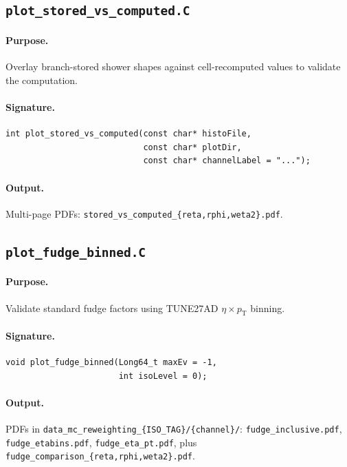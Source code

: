 \documentclass[12pt,a4paper]{article}
\begin{document}
\subsection{\texttt{plot\_stored\_vs\_computed.C}}
\label{sec:scripts:stored_vs_computed}

\paragraph{Purpose.} Overlay branch-stored shower shapes against
cell-recomputed values to validate the computation.

\paragraph{Signature.}
\begin{lstlisting}[style=cppstyle]
int plot_stored_vs_computed(const char* histoFile,
                            const char* plotDir,
                            const char* channelLabel = "...");
\end{lstlisting}

\paragraph{Output.} Multi-page PDFs:
\texttt{stored\_vs\_computed\_\{reta,rphi,weta2\}.pdf}.

\subsection{\texttt{plot\_fudge\_binned.C}}
\label{sec:scripts:fudge}

\paragraph{Purpose.} Validate standard fudge factors using TUNE27AD
$\eta\times p_\text{T}$ binning.

\paragraph{Signature.}
\begin{lstlisting}[style=cppstyle]
void plot_fudge_binned(Long64_t maxEv = -1,
                       int isoLevel = 0);
\end{lstlisting}

\paragraph{Output.} PDFs in
\texttt{data\_mc\_reweighting\_\{ISO\_TAG\}/\{channel\}/}:
\texttt{fudge\_inclusive.pdf}, \texttt{fudge\_etabins.pdf},
\texttt{fudge\_eta\_pt.pdf}, plus
\texttt{fudge\_comparison\_\{reta,rphi,weta2\}.pdf}.
\end{document}
